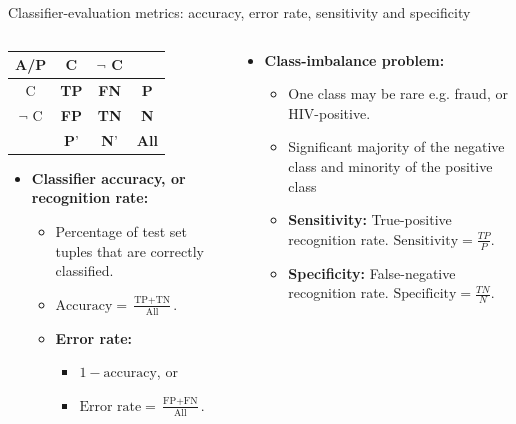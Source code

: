 \documentclass[aspectratio=169,t,table]{beamer}
\begin{document}
  {
    \begin{frame}{Classifier-evaluation metrics: accuracy, error rate, sensitivity and specificity}
      \begin{columns}
        \begin{column}{0.5\textwidth}
          \centering
          \begin{tabular}{|c|c|c|c|}
            \hline
            A/P & C & $\neg$ C & \\\hline
            C & \textbf{TP} & \textbf{FN} & \textbf{P}\\\hline
            $\neg$ C & \textbf{FP} & \textbf{TN} & \textbf{N} \\\hline
            & \textbf{P}' & \textbf{N}' & \textbf{All}\\\hline
          \end{tabular}
          \begin{itemize}
            \item \textbf{Classifier accuracy, or recognition rate:}
            \begin{itemize}
              \item Percentage of test set tuples that are correctly classified.
              \item $\text{Accuracy} = \frac{\text{TP} + \text{TN}}{\text{All}}.$
              \item \textbf{Error rate:}
                \begin{itemize}
                  \item $1-\text{accuracy}$, or
                  \item $\text{Error rate} = \frac{\text{FP}+\text{FN}}{\text{All}}.$
                \end{itemize}
            \end{itemize}
          \end{itemize}
        \end{column}
        \begin{column}{0.5\textwidth}
          \begin{itemize}
            \item \textbf{Class-imbalance problem:}
            \begin{itemize}
              \item One class may be rare e.g. fraud, or HIV-positive.
              \item Significant majority of the negative class and minority of the positive class
              \item \textbf{Sensitivity:} True-positive recognition rate. $\text{Sensitivity} = \frac{TP}{P}$.
              \item \textbf{Specificity:} False-negative recognition rate. $\text{Specificity} = \frac{TN}{N}$.
            \end{itemize}
          \end{itemize}
        \end{column}
      \end{columns}
    \end{frame}
  }
\end{document}
